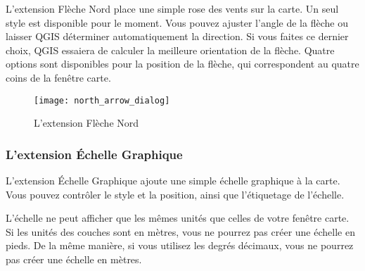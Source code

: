 L'extension Fl\`eche Nord place une simple rose des vents sur la carte. Un seul
style est disponible pour le moment. Vous pouvez ajuster l'angle de la fl\`eche 
ou laisser QGIS d\'eterminer automatiquement la direction. Si vous faites ce 
dernier choix, QGIS essaiera de calculer la meilleure orientation de la fl\`eche.
Quatre options sont disponibles pour la position de la fl\`eche, qui correspondent
au quatre coins de la fen\^etre carte.

\begin{figure}[ht]
   \begin{center}
   \caption{L'extension Fl\`eche Nord \nixcaption}\label{fig:north_arrow}\smallskip
   \texttt{[image: north\_arrow\_dialog]}
\end{center}  
\end{figure}

\subsubsection{L'extension \'Echelle Graphique}
L'extension \'Echelle Graphique ajoute une simple \'echelle graphique \`a la carte.
Vous pouvez contr\^oler le style et la position, ainsi que l'\'etiquetage de l'\'echelle.

L'\'echelle ne peut afficher que les m\^emes unit\'es que celles de votre fen\^etre carte.
Si les unit\'es des couches sont en m\`etres, vous ne pourrez pas cr\'eer une \'echelle en
pieds. De la m\^eme mani\`ere, si vous utilisez les degr\'es d\'ecimaux, vous ne pourrez 
pas cr\'eer une \'echelle en m\`etres.


